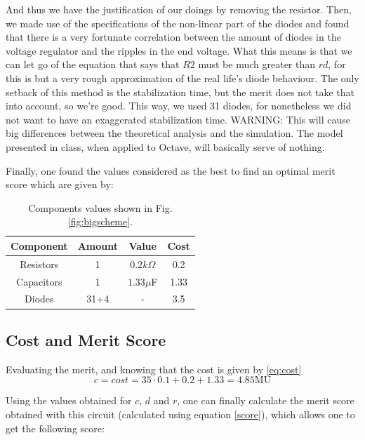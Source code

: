 And thus we have the justification of our doings by removing the resistor. Then, we made use of the specifications of the non-linear part of the diodes and found that there is a very fortunate correlation between the amount of diodes in the voltage regulator and the ripples in the end voltage. What this means is that we can let go of the equation that says that $R2$ must be much greater than $rd$, for this is but a very rough approximation of the real life's diode behaviour. The only setback of this method is the stabilization time, but the merit does not take that into account, so we're good. This way, we used 31 diodes, for nonetheless we did not want to have an exaggerated stabilization time. WARNING: This will cause big differences between the theoretical analysis and the simulation. The model presented in class, when applied to Octave, will basically serve of nothing.

Finally, one found the values considered as the best to find an optimal merit score which are given by:

\begin{table}[H]
    \centering
    \begin{tabular}{|c|c|c|c|}
    \hline
        \textbf{Component} &  \textbf{Amount} & \textbf{Value} & \textbf{Cost}\\
        \hline
        \hline
        Resistors & 1 & $0.2k\Omega$ & 0.2\\
        \hline
        Capacitors & 1 &  $1.33\mu$F & 1.33\\
        \hline
        Diodes & 31+4 & - & 3.5 \\
        \hline
    \end{tabular}
    \caption{Components values shown in Fig. \ref{fig:bigscheme}.}
    \label{tab:tentativas}
\end{table}


\subsection{Cost and Merit Score}
Evaluating the merit, and knowing that the cost is given by \eqref{eq:cost}
\begin{equation}
    c = cost = 35 \cdot 0.1 + 0.2 + 1.33 =  4.85\text{MU}
    \label{eq:cost}
\end{equation}

Using the values obtained for $c$, $d$ and $r$, one can finally calculate the merit score obtained with this circuit (calculated using equation \eqref{score}), which allows one to get the following score:

